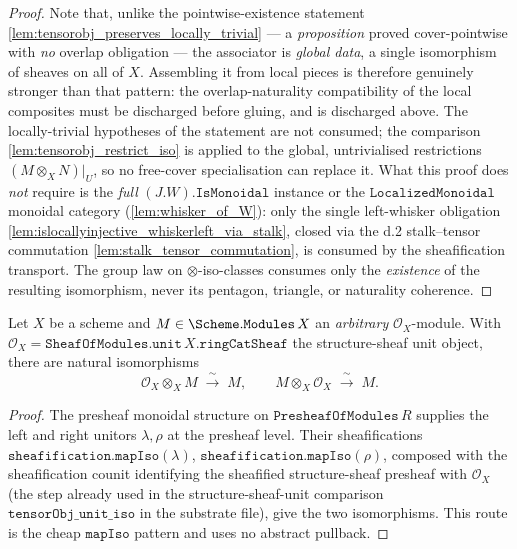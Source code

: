 \begin{proof}
  Note that, unlike the pointwise-existence statement
  \cref{lem:tensorobj_preserves_locally_trivial} --- a \emph{proposition} proved
  cover-pointwise with \emph{no} overlap obligation --- the associator is
  \emph{global data}, a single isomorphism of sheaves on all of \(X\). Assembling it
  from local pieces is therefore genuinely stronger than that pattern: the
  overlap-naturality compatibility of the local composites must be discharged before
  gluing, and is discharged above. The locally-trivial hypotheses of the statement
  are not consumed; the comparison \cref{lem:tensorobj_restrict_iso} is applied to the
  global, untrivialised restrictions \((M \otimes_X N)|_U\), so no free-cover
  specialisation can replace it. What this proof does \emph{not} require is the
  \emph{full} \((J.W).\mathtt{IsMonoidal}\) instance or the
  \(\mathtt{LocalizedMonoidal}\) monoidal category
  (\cref{lem:whisker_of_W}): only the single left-whisker obligation
  \cref{lem:islocallyinjective_whiskerleft_via_stalk}, closed via the d.2 stalk--tensor
  commutation \cref{lem:stalk_tensor_commutation}, is consumed by the sheafification
  transport. The group law on \(\otimes\)-iso-classes
  consumes only the \emph{existence} of the resulting isomorphism, never its pentagon,
  triangle, or naturality coherence.
\end{proof}

\begin{lemma}
  \leanok
  \label{lem:tensorobj_unit_iso}
  Let \(X\) be a scheme and \(M \in \Scheme.\mathtt{Modules}\,X\) an
  \emph{arbitrary} \(\mathcal{O}_X\)-module. With
  \(\mathcal{O}_X = \mathtt{SheafOfModules.unit}\,X.\mathtt{ringCatSheaf}\) the
  structure-sheaf unit object, there are natural isomorphisms
  \[
    \mathcal{O}_X \otimes_X M \;\xrightarrow{\ \sim\ }\; M,
    \qquad
    M \otimes_X \mathcal{O}_X \;\xrightarrow{\ \sim\ }\; M .
  \]
\end{lemma}

\begin{proof}
  \leanok
  The presheaf monoidal structure on \(\mathtt{PresheafOfModules}\,R\) supplies
  the left and right unitors \(\lambda, \rho\) at the presheaf level. Their
  sheafifications \(\mathtt{sheafification.mapIso}(\lambda)\),
  \(\mathtt{sheafification.mapIso}(\rho)\), composed with the sheafification
  counit identifying the sheafified structure-sheaf presheaf with
  \(\mathcal{O}_X\) (the step already used in the structure-sheaf-unit
  comparison \(\mathtt{tensorObj\_unit\_iso}\) in the substrate file), give the
  two isomorphisms. This route is the cheap \(\mathtt{mapIso}\) pattern and uses no
  abstract pullback.
\end{proof}

